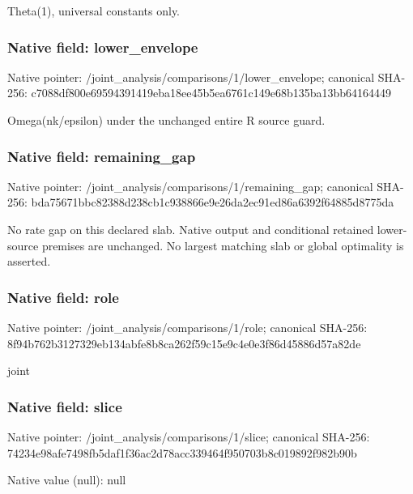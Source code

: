 \documentclass[10pt,a4paper]{article}
\begin{document}
\begingroup\raggedright\sloppy Theta(1),\allowbreak{} universal constants only.\par\endgroup

\subsubsection{Native field: lower\_\allowbreak{}envelope}
Native pointer: /joint\_\allowbreak{}analysis/comparisons/1/lower\_\allowbreak{}envelope; canonical SHA-256: c7088df800e69594391419eba18ee45b5ea6761c149e68b135ba13bb64164449

\begingroup\raggedright\sloppy Omega(nk/\allowbreak{}epsilon) under the unchanged entire R source guard.\par\endgroup

\subsubsection{Native field: remaining\_\allowbreak{}gap}
Native pointer: /joint\_\allowbreak{}analysis/comparisons/1/remaining\_\allowbreak{}gap; canonical SHA-256: bda75671bbc82388d238cb1c938866e9e26da2ec91ed86a6392f64885d8775da

\begingroup\raggedright\sloppy No rate gap on this declared slab. Native output and conditional retained lower-source premises are unchanged. No largest matching slab or global optimality is asserted.\par\endgroup

\subsubsection{Native field: role}
Native pointer: /joint\_\allowbreak{}analysis/comparisons/1/role; canonical SHA-256: 8f94b762b3127329eb134abfe8b8ca262f59c15e9c4e0e3f86d45886d57a82de

\begingroup\raggedright\sloppy joint\par\endgroup

\subsubsection{Native field: slice}
Native pointer: /joint\_\allowbreak{}analysis/comparisons/1/slice; canonical SHA-256: 74234e98afe7498fb5daf1f36ac2d78acc339464f950703b8c019892f982b90b

Native value (null): null
\end{document}
